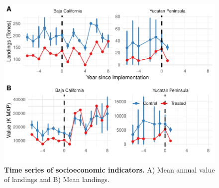 \documentclass[10pt]{article}
\begin{document}
\clearpage

\begin{figure}[h]
\centering
\includegraphics{img/S5_fig.pdf}
\caption{{\bf Time series of socioeconomic indicators.} A) Mean annual value of landings and B) Mean landings.}
\end{figure}

\clearpage

\end{document}
